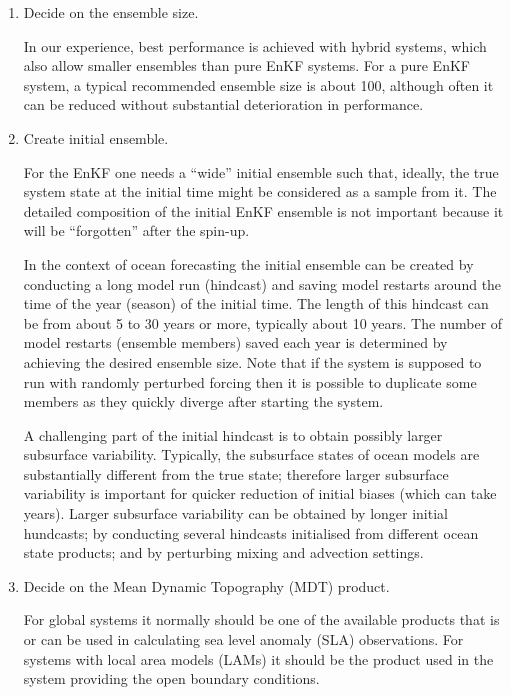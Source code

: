 \documentclass[11pt]{report}
\begin{document}
\begin{enumerate}

\item{Decide on the ensemble size.}

  In our experience, best performance is achieved with hybrid systems, which also allow smaller ensembles than pure EnKF systems.
  For a pure EnKF system, a typical recommended ensemble size is about 100, although often it can be reduced without substantial deterioration in performance.
  
\item{Create initial ensemble.}

  For the EnKF one needs a ``wide'' initial ensemble such that, ideally, the true system state at the initial time might be considered as a sample from it.
  The detailed composition of the initial EnKF ensemble is not important because it will be ``forgotten'' after the spin-up.
  
  In the context of ocean forecasting the initial ensemble can be created by conducting a long model run (hindcast) and saving model restarts around the time of the year (season) of the initial time.
  The length of this hindcast can be from about 5 to 30 years or more, typically about 10 years.
  The number of model restarts (ensemble members) saved each year is determined by achieving the desired ensemble size.
  Note that if the system is supposed to run with randomly perturbed forcing then it is possible to duplicate some members as they quickly diverge after starting the system.

  A challenging part of the initial hindcast is to obtain possibly larger subsurface variability.
  Typically, the subsurface states of ocean models are substantially different from the true state; therefore larger subsurface variability is important for quicker reduction of initial biases (which can take years).
  Larger subsurface variability can be obtained by longer initial hundcasts; by conducting several hindcasts initialised from different ocean state products; and by perturbing mixing and advection settings.

\item{Decide on the Mean Dynamic Topography (MDT) product.}

  For global systems it normally should be one of the available products that is or can be used in calculating sea level anomaly (SLA) observations.
  For systems with local area models (LAMs) it should be the product used in the system providing the open boundary conditions.


\end{enumerate}
\end{document}
